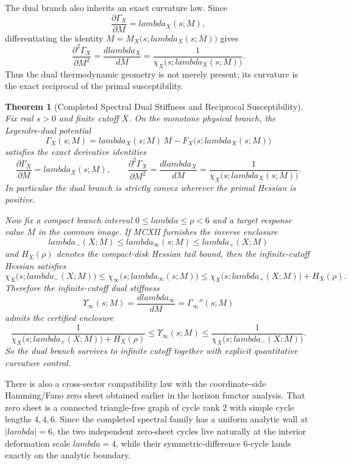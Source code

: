 \documentclass[12pt,a4paper]{article}
\def\mathcal#1{#1}%
\def\lambda{lambda}%
\newtheorem{theorem}{Theorem}[section]
\theoremstyle{definition}
\begin{document}
The dual branch also inherits an exact curvature law. Since
\[
\frac{\partial\Gamma_X}{\partial M}=\lambda_X(s;M),
\]
differentiating the identity $M=\mathcal M_X\bigl(s;\lambda_X(s;M)\bigr)$ gives
\[
\frac{\partial^2\Gamma_X}{\partial M^2}=\frac{d\lambda_X}{dM}=\frac{1}{\chi_X\bigl(s;\lambda_X(s;M)\bigr)}.
\]
Thus the dual thermodynamic geometry is not merely present; its curvature is the exact reciprocal of the primal susceptibility.

\begin{theorem}[Completed Spectral Dual Stiffness and Reciprocal Susceptibility]
Fix real $s>0$ and finite cutoff $X$. On the monotone physical branch, the Legendre-dual potential
\[
\Gamma_X(s;M)=\lambda_X(s;M)\,M-\mathcal F_X\bigl(s;\lambda_X(s;M)\bigr)
\]
satisfies the exact derivative identities
\[
\frac{\partial\Gamma_X}{\partial M}=\lambda_X(s;M),
\qquad
\frac{\partial^2\Gamma_X}{\partial M^2}=\frac{d\lambda_X}{dM}=\frac{1}{\chi_X\bigl(s;\lambda_X(s;M)\bigr)}.
\]
In particular the dual branch is strictly convex wherever the primal Hessian is positive.

Now fix a compact branch interval $0\le\lambda\le\rho<6$ and a target response value $M$ in the common image. If MCXII furnishes the inverse enclosure
\[
\lambda_-(X;M)\le \lambda_\infty(s;M)\le \lambda_+(X;M)
\]
and $H_X(\rho)$ denotes the compact-disk Hessian tail bound, then the infinite-cutoff Hessian satisfies
\[
\chi_X\bigl(s;\lambda_-(X;M)\bigr)
\le
\chi_\infty\bigl(s;\lambda_\infty(s;M)\bigr)
\le
\chi_X\bigl(s;\lambda_+(X;M)\bigr)+H_X(\rho).
\]
Therefore the infinite-cutoff dual stiffness
\[
\Upsilon_\infty(s;M)=\frac{d\lambda_\infty}{dM}=\Gamma_\infty''(s;M)
\]
admits the certified enclosure
\[
\frac{1}{\chi_X\bigl(s;\lambda_+(X;M)\bigr)+H_X(\rho)}
\le
\Upsilon_\infty(s;M)
\le
\frac{1}{\chi_X\bigl(s;\lambda_-(X;M)\bigr)}.
\]
So the dual branch survives to infinite cutoff together with explicit quantitative curvature control.
\end{theorem}

There is also a cross-sector compatibility law with the coordinate-side Hamming/Fano zero sheet obtained earlier in the horizon functor analysis. That zero sheet is a connected triangle-free graph of cycle rank $2$ with simple cycle lengths $4,4,6$. Since the completed spectral family has a uniform analytic wall at $|\lambda|=6$, the two independent zero-sheet cycles live naturally at the interior deformation scale $\lambda=4$, while their symmetric-difference $6$-cycle lands exactly on the analytic boundary.
\end{document}
